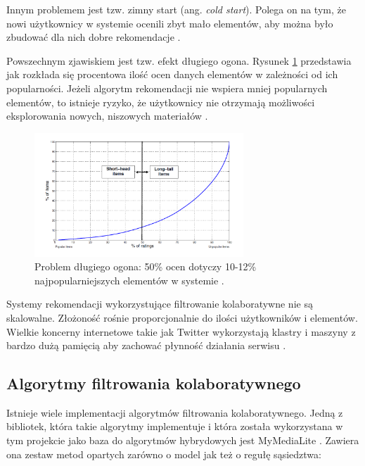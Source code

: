 \documentclass[twoside]{iisthesis}
\begin{document}
	  Innym problemem jest tzw. zimny start (ang. \textit{cold start}). Polega on na tym, że nowi użytkownicy w systemie ocenili zbyt mało elementów, aby można było zbudować dla nich dobre rekomendacje \cite{id:RubensRecSysHB2010,id:zhang2015hybrid}.
	  
	  Powszechnym zjawiskiem jest tzw. efekt długiego ogona. Rysunek \ref{fig:longtail} przedstawia jak rozkłada się procentowa ilość ocen danych elementów w zależności od ich popularności. Jeżeli algorytm rekomendacji nie wspiera mniej popularnych elementów, to istnieje ryzyko, że użytkownicy nie otrzymają możliwości eksplorowania nowych, niszowych materiałów \cite{id:celma2010music,id:RubensRecSysHB2010}.
	  
	  \begin{figure}[!ht] 
	  	\centering
	  	\includegraphics[width=0.7\textwidth]{longtail}
	  	\caption{Problem długiego ogona: 50\% ocen dotyczy 10-12\% najpopularniejszych elementów w systemie \protect\cite{id:RubensRecSysHB2010}.}
	  	\label{fig:longtail}
	  \end{figure}
	  
	  Systemy rekomendacji wykorzystujące filtrowanie kolaboratywne nie są skalowalne. Złożoność rośnie proporcjonalnie do ilości użytkowników i elementów. Wielkie koncerny internetowe takie jak Twitter wykorzystają klastry i maszyny z bardzo dużą pamięcią aby zachować płynność działania serwisu \cite{id:gupta2013wtf}.
	 
	 \subsection{Algorytmy filtrowania kolaboratywnego}
	 
	 Istnieje wiele implementacji algorytmów filtrowania kolaboratywnego. Jedną z bibliotek, która takie algorytmy implementuje i która została wykorzystana w tym projekcie jako baza do algorytmów hybrydowych jest MyMediaLite \cite{mymedialite,gantner2011mymedialite}. Zawiera ona zestaw metod opartych zarówno o model jak też o regułę sąsiedztwa:
	 
\end{document}
